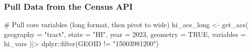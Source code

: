 \documentclass[
  letterpaper,
  DIV=11,
  numbers=noendperiod]{scrartcl}
\newenvironment{Shaded}{\begin{snugshade}}{\end{snugshade}}
\newcommand{\AttributeTok}[1]{\textcolor[rgb]{0.40,0.45,0.13}{#1}}
\newcommand{\CommentTok}[1]{\textcolor[rgb]{0.37,0.37,0.37}{#1}}
\newcommand{\ConstantTok}[1]{\textcolor[rgb]{0.56,0.35,0.01}{#1}}
\newcommand{\DecValTok}[1]{\textcolor[rgb]{0.68,0.00,0.00}{#1}}
\newcommand{\FunctionTok}[1]{\textcolor[rgb]{0.28,0.35,0.67}{#1}}
\newcommand{\NormalTok}[1]{\textcolor[rgb]{0.00,0.23,0.31}{#1}}
\newcommand{\OtherTok}[1]{\textcolor[rgb]{0.00,0.23,0.31}{#1}}
\newcommand{\SpecialCharTok}[1]{\textcolor[rgb]{0.37,0.37,0.37}{#1}}
\newcommand{\StringTok}[1]{\textcolor[rgb]{0.13,0.47,0.30}{#1}}
\begin{document}
\subsubsection{Pull Data from the Census
API}\label{pull-data-from-the-census-api}

\begin{Shaded}
\begin{Highlighting}[]
\CommentTok{\# Pull core variables (long format, then pivot to wide)}
\NormalTok{hi\_acs\_long }\OtherTok{\textless{}{-}} \FunctionTok{get\_acs}\NormalTok{(}
  \AttributeTok{geography =} \StringTok{"tract"}\NormalTok{,}
  \AttributeTok{state =} \StringTok{"HI"}\NormalTok{,}
  \AttributeTok{year =} \DecValTok{2023}\NormalTok{,}
  \AttributeTok{geometry =} \ConstantTok{TRUE}\NormalTok{,}
  \AttributeTok{variables =}\NormalTok{ hi\_vars}
\NormalTok{)}\SpecialCharTok{|\textgreater{}}
\NormalTok{  dplyr}\SpecialCharTok{::}\FunctionTok{filter}\NormalTok{(GEOID }\SpecialCharTok{!=} \StringTok{"15003981200"}\NormalTok{)}
\end{Highlighting}
\end{Shaded}
\end{document}
